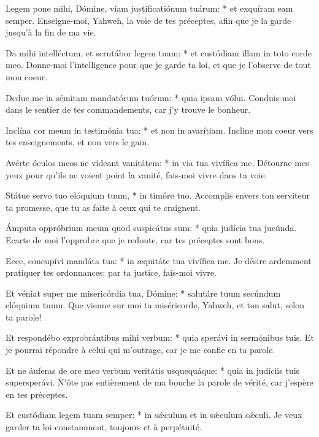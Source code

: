 \begin{paracol}{2}

\LigneParacol
{Legem pone mihi, Dómine, viam justificatiónum tuárum: * et exquíram eam semper.}
{Enseigne-moi, Yahweh, la voie de tes préceptes, afin que je la garde jusqu'à la fin de ma vie.}

\LigneParacol
{Da mihi intelléctum, et scrutábor legem tuam: * et custódiam illam in toto corde meo.}
{Donne-moi l'intelligence pour que je garde ta loi, et que je l'observe de tout mon coeur.}

\LigneParacol
{Deduc me in sémitam mandatórum tuórum: * quia ipsam vólui.}
{Conduis-moi dans le sentier de tes commandements, car j'y trouve le bonheur.}

\LigneParacol
{Inclína cor meum in testimónia tua: * et non in avarítiam.}
{Incline mon coeur vers tes enseignements, et non vers le gain.}

\LigneParacol
{Avérte óculos meos ne vídeant vanitátem: * in via tua vivífica me.}
{Détourne mes yeux pour qu'ils ne voient point la vanité, fais-moi vivre dans ta voie.}

\LigneParacol
{Státue servo tuo elóquium tuum, * in timóre tuo.}
{Accomplis envers ton serviteur ta promesse, que tu as faite à ceux qui te craignent.}

\LigneParacol
{Ámputa oppróbrium meum quod suspicátus sum: * quia judícia tua jucúnda.}
{Ecarte de moi l'opprobre que je redoute, car tes préceptes sont bons.}

\LigneParacol
{Ecce, concupívi mandáta tua: * in æquitáte tua vivífica me.}
{Je désire ardemment pratiquer tes ordonnances: par ta justice, fais-moi vivre. }

\LigneParacol
{Et véniat super me misericórdia tua, Dómine: * salutáre tuum secúndum elóquium tuum.}
{Que vienne sur moi ta miséricorde, Yahweh, et ton salut, selon ta parole!}

\LigneParacol
{Et respondébo exprobrántibus mihi verbum: * quia sperávi in sermónibus tuis.}
{Et je pourrai répondre à celui qui m'outrage, car je me confie en ta parole.}

\LigneParacol
{Et ne áuferas de ore meo verbum veritátis usquequáque: * quia in judíciis tuis supersperávi.}
{N'ôte pas entièrement de ma bouche la parole de vérité, car j'espère en tes préceptes.}

\LigneParacol
{Et custódiam legem tuam semper: * in sǽculum et in sǽculum sǽculi.}
{Je veux garder ta loi constamment, toujours et à perpétuité.}


\end{paracol}
